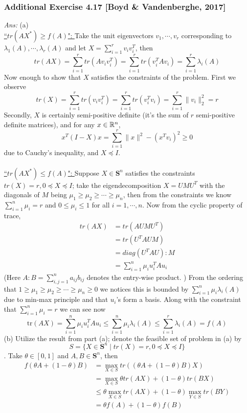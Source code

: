 \documentclass[12pt,a4paper]{article}
\newcommand{\SUM}[2]{\sum\limits_{#1}^{#2}}
\def\tr{\text{tr}}
\def\R{\ifmmode\mathbb R\fi}
\def\vS{\mathbf{S}}
\begin{document}
\newpage\subsubsection*{Additional Exercise 4.17 [Boyd \& Vandenberghe, 2017]}
{\it Ans:} (a) \\
\underline{``$tr(AX^\ast) \geq f(A)$": } Take the unit eigenvectors $v_1, \cdots, v_r$ corresponding to $\lambda_1(A), \cdots, \lambda_r(A)$ and let 
$X = \SUM{i=1}r v_iv_i^T$, then 
$$tr(AX) = \SUM{i=1}r tr(Av_iv_i^T) = \SUM{i=1}r tr(v_i^TAv_i) = \SUM{i=1}r \lambda_i(A)$$
Now enough to show that $X$ satisfies the constraints of the problem. First we observe 
$$tr(X) = \SUM{i=1}r tr(v_iv_i^T) = \SUM{i=1}r tr(v_i^Tv_i) = \SUM{i=1}r \|v_i\|^2_2 = r$$
Secondly, $X$ is certainly semi-positive definite (it's the sum of $r$ semi-positive definite matrices), and for any $x \in \R^n$, 
$$x^T (I - X) x = \SUM{i=1}r \|x\|^2 - (x^T v_i)^2 \geq 0$$
due to Cauchy's inequality, and $X \preceq I$. \\
\\
\underline{``$tr(AX^\ast) \leq f(A)$": } Suppose $X \in \vS^n$ satisfies the constraints $tr(X) = r, 0 \preceq X \preceq I$; take the eigendecomposition $X = UM U^T$ with the diagonals of $M$ being $\mu_1 \geq \mu_2 \geq \cdots \geq \mu_n$, then from the constraints we know $\SUM{i=1}n \mu_i = r$ and $0 \leq \mu_i \leq 1$ for all $i=1, \cdots, n$. Now from the cyclic property of trace, 
\begin{align*}
tr(AX) &= tr(AUM U^T) \\
&= tr(U^T AU M) \\
&= diag(U^TAU) : M \\
&= \SUM{i=1}n \mu_i u_i^T A u_i
\end{align*}
(Here $A:B = \SUM{i,j = 1}n a_{ij}b_{ij}$ denotes the entry-wise product. ) From the ordering that $1\geq \mu_1\geq \mu_2 \geq \cdots \geq \mu_n \geq 0$ we notices this is bounded by $\SUM{i=1}n \mu_i \lambda_i(A)$ due to min-max principle and that $u_i$'s form a basis. Along with the constraint that $\SUM{i=1}n \mu_i = r$ we can see now 
$$\tr(AX) = \SUM{i=1}n \mu_i u_i^T A u_i \leq \SUM{i=1}n \mu_i \lambda_i(A) \leq \SUM{i=1}r \lambda_i(A) = f(A)$$
(b) Utilize the result from part (a); denote the feasible set of problem in (a) by 
$$S = \{X \in \vS^n \mid tr(X) = r,0\preceq X \preceq I\}$$. Take $\theta \in [0,1]$ and $A, B \in \vS^n$, then 
\begin{align*}
f(\theta A + (1-\theta)B) &= \max_{X \in S} tr((\theta A + (1-\theta)B)X)\\
&= \max_{X \in S} \theta tr(AX) + (1-\theta) tr(BX) \\
&\leq \theta \max_{X\in S} tr(AX) + (1-\theta) \max_{Y \in S} tr(BY) \\
&= \theta f(A) + (1-\theta)f(B)
\end{align*} 
\end{document}
